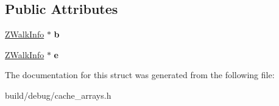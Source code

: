 \subsection*{Public Attributes}
\begin{DoxyCompactItemize}
\item 
\hypertarget{structZCands_ab12a1a741c64665393619a3307b7e3a5}{\hyperlink{structZWalkInfo}{Z\-Walk\-Info} $\ast$ {\bfseries b}}\label{structZCands_ab12a1a741c64665393619a3307b7e3a5}

\item 
\hypertarget{structZCands_a672be8b5e79e32e461d6a58d6d2ce4af}{\hyperlink{structZWalkInfo}{Z\-Walk\-Info} $\ast$ {\bfseries e}}\label{structZCands_a672be8b5e79e32e461d6a58d6d2ce4af}

\end{DoxyCompactItemize}


The documentation for this struct was generated from the following file\-:\begin{DoxyCompactItemize}
\item 
build/debug/cache\-\_\-arrays.\-h\end{DoxyCompactItemize}

